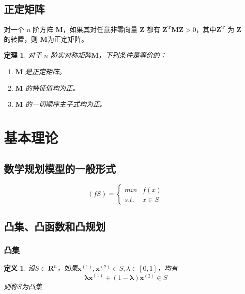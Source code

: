 \documentclass{book}
\newtheorem{theorem}{定理}[chapter]
\newtheorem{definition}{\indent 定义}[chapter]
\begin{document}
\subsection{正定矩阵}

对一个 $n$ 阶方阵 $\boldsymbol{M}$，如果其对任意非零向量 $\boldsymbol{Z}$ 都有 $\boldsymbol{Z^TMZ}>0$，其中$\boldsymbol{Z^T}$ 为 $\boldsymbol{Z}$ 的转置，则 $\boldsymbol{M}$为正定矩阵。
\begin{theorem}
    对于 $n$ 阶实对称矩阵$\boldsymbol{M}$，下列条件是等价的：
    \begin{enumerate}
        \item $\boldsymbol{M}$ 是正定矩阵。
        \item $\boldsymbol{M}$ 的特征值均为正。
        \item $\boldsymbol{M}$ 的一切顺序主子式均为正。
    \end{enumerate}
\end{theorem}

\section{基本理论}
\subsection{数学规划模型的一般形式}

\begin{equation}
    (fS) = \begin{cases}
        min  & f(x)    \\
        s.t. & x \in S
    \end{cases}
    \label{con:general form}
\end{equation}

\subsection{凸集、凸函数和凸规划}
\subsubsection{凸集}

\begin{definition}
    设$S \subset \mathbf{R}^n$，如果$\boldsymbol{x}^{(1)}, \boldsymbol{x}^{(2)} \in S, \lambda \in [0, 1]$，均有
    \begin{equation}
        \boldsymbol{\lambda x}^{(1)}+(1-\boldsymbol{\lambda})\boldsymbol{x}^{(2)} \in S
    \end{equation}
    则称$S$为凸集
\end{definition}
\end{document}
